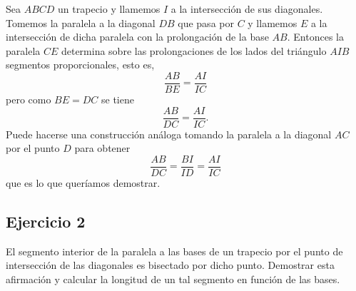 	\begin{sol}
		Sea $ABCD$ un trapecio y llamemos $I$ a la intersección de sus diagonales. Tomemos la paralela a la diagonal $DB$ que pasa por $C$ y llamemos $E$ a la intersección de dicha paralela con la prolongación de la base $AB$. Entonces la paralela $CE$ determina sobre las prolongaciones de los lados del triángulo $AIB$ segmentos proporcionales, esto es,
		\[ \frac{AB}{BE} = \frac{AI}{IC} \]
		pero como $BE = DC$ se tiene
		\[ \frac{AB}{DC} = \frac{AI}{IC}. \]
		Puede hacerse una construcción análoga tomando la paralela a la diagonal $AC$ por el punto $D$ para obtener
		\[ \frac{AB}{DC} = \frac{BI}{ID} = \frac{AI}{IC} \]
		que es lo que queríamos demostrar.
	\end{sol}

\subsection*{Ejercicio 2}
El segmento interior de la paralela a las bases de un trapecio por el
punto de intersección de las diagonales es bisectado por dicho punto.
Demostrar esta afirmación y calcular la longitud de un tal segmento en
función de las bases.
